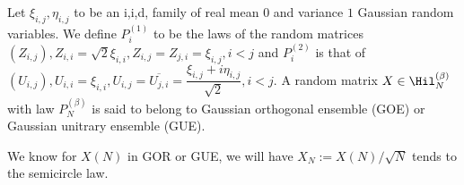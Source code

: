 \begin{definition}
    Let $\xi_{i,j},\eta_{i,j}$ to be an i,i,d, family of real mean $0$ and variance $1$ Gaussian random variables. We define $P_i^{(1)}$ to be the laws of the random matrices $(Z_{i,j}), Z_{i,i} = \sqrt{2}\xi_{i,i}, Z_{i,j} = Z_{j,i} = \xi_{i,j}, i<j$ and $P_i^{(2)}$ is that of $(U_{i,j}), U_{i,i} = \xi_{i,i}, U_{i,j} = \overline{U_{j,i}} = \dfrac{\xi_{i,j}+i\eta_{i,j}}{\sqrt{2}}, i<j$. A random matrix $X\in \Hil_N^{(\beta)}$ with law $P_N^{(\beta)}$ is said to belong to Gaussian orthogonal ensemble (GOE) or Gaussian unitrary ensemble (GUE).
\end{definition}

We know for $X(N)$ in GOR or GUE, we will have $X_N := X(N)/\sqrt{N}$ tends to the semicircle law.
